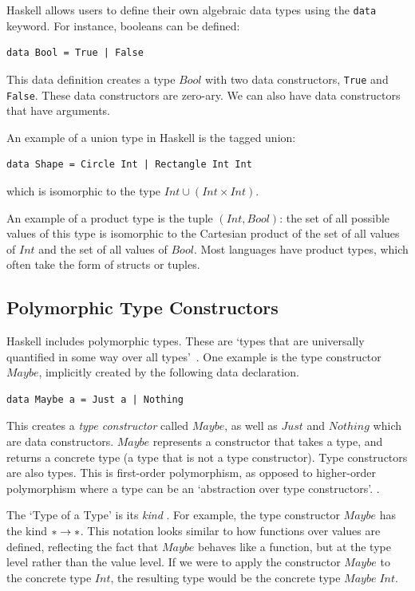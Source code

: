 Haskell allows users to define their own algebraic data types using the \lstinline[language=SFL]|data| keyword. For instance, booleans can be defined:

\begin{lstlisting}[language=SFL]
data Bool = True | False
\end{lstlisting} 

\noindent This data definition creates a type $Bool$ with two data constructors, \verb|True| and \verb|False|. These data constructors are zero-ary. We can also have data constructors that have arguments. 

An example of a union type in Haskell is the tagged union:
\begin{lstlisting}[language=SFL]
data Shape = Circle Int | Rectangle Int Int
\end{lstlisting} 
\noindent which is isomorphic to the type \(Int \cup (Int \times Int)\). 

An example of a product type is the tuple \((Int, Bool)\): the set of all possible values of this type is isomorphic to the Cartesian product of the set of all values of \(Int\) and the set of all values of $Bool$. Most languages have product types, which often take the form of structs or tuples. 

\subsection{Polymorphic Type Constructors}
Haskell includes polymorphic types. These are `types that are universally quantified in some way over all types'~\cite{hudak1992gentle}. One example is the type constructor $Maybe$, implicitly created by the following data declaration.

\begin{lstlisting}[language=SFL]
data Maybe a = Just a | Nothing
\end{lstlisting} 

This creates a \textit{type constructor} called \(Maybe\), as well as $Just$ and $Nothing$ which are data constructors. $Maybe$ represents a constructor that takes a type, and returns a concrete type (a type that is not a type constructor). Type constructors are also types. This is first-order polymorphism, as opposed to higher-order polymorphism where a type can be an `abstraction over type constructors'. \cite{yallop2014lightweightpoly}. 

The `Type of a Type' is its \emph{kind} \cite{pierce2002types}. For example, the type constructor $Maybe$ has the kind $* \rightarrow *$. This notation looks similar to how functions over values are defined, reflecting the fact that $Maybe$ behaves like a function, but at the type level rather than the value level. If we were to apply the constructor \(Maybe\) to the concrete type \(Int\), the resulting type would be the concrete type \(Maybe \;Int\). 

